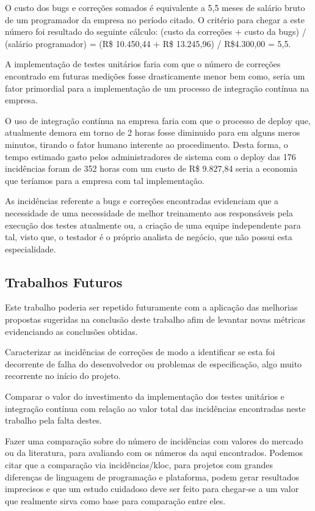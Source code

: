 \documentclass[11pt, a4paper]{article}
\begin{document}
O custo dos bugs e correções somados é equivalente a 5,5 meses de salário bruto de um programador da empresa no período citado. O critério para chegar a este número foi resultado do seguinte cálculo: (custo da correções + custo da bugs) / (salário programador) = (R\$ 10.450,44 + R\$ 13.245,96) / R\$4.300,00 = 5,5.

A implementação de testes unitários faria com que o número de correções encontrado em futuras medições fosse drasticamente menor bem como, seria um fator primordial para a implementação de um processo de integração contínua na empresa.

O uso de integração contínua na empresa faria com que o processo de deploy que, atualmente demora em torno de 2 horas fosse diminuido para em alguns meros minutos, tirando o fator humano interente ao procedimento. Desta forma, o tempo estimado gasto pelos administradores de sistema com o deploy das 176 incidências foram de 352 horas com um custo de R\$ 9.827,84 seria a economia que teríamos para a empresa com tal implementação.

As incidências referente a bugs e correções encontradas evidenciam que a necessidade de uma necessidade de melhor treinamento aos responsáveis pela execução dos testes atualmente ou, a criação de uma equipe independente para tal, visto que, o testador é o próprio analista de negócio, que não possui esta especialidade.

\subsection{Trabalhos Futuros}
Este trabalho poderia ser repetido futuramente com a aplicação das melhorias propostas sugeridas na conclusão deste trabalho afim de levantar novas métricas evidenciando as conclusões obtidas.

Caracterizar as incidências de correções de modo a identificar se esta foi decorrente de falha do desenvolvedor ou problemas de especificação, algo muito recorrente no início do projeto.

Comparar o valor do investimento da implementação dos testes unitários e integração contínua com relação ao valor total das incidências encontradas neste trabalho pela falta destes.\cite{defect-origin-removal}

Fazer uma comparação sobre do número de incidências com valores do mercado ou da literatura, para avaliando com os números da aqui encontrados. Podemos citar que a comparação via incidências/kloc, para projetos com grandes diferenças de linguagem de programação e plataforma, podem gerar resultados imprecisos \cite{loc-metric} \cite{bugs-loc} e que um estudo cuidadoso deve ser feito para chegar-se a um valor que realmente sirva como base para comparação entre eles.


\end{document}
